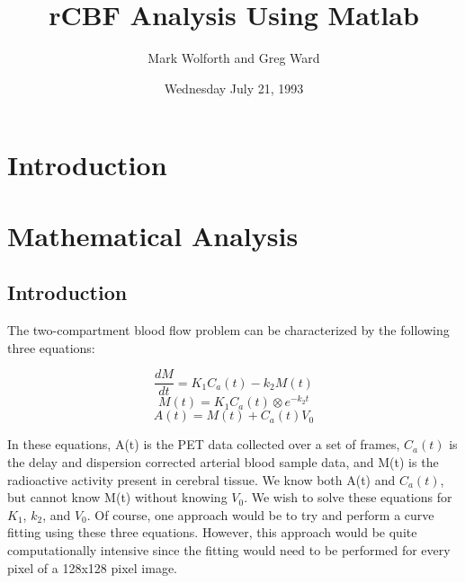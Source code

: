
\title{rCBF Analysis Using Matlab}
\author{Mark Wolforth and Greg Ward}
\date{Wednesday July 21, 1993}



\maketitle
\newpage

\tableofcontents

\newpage
\section{Introduction}


\section{Mathematical Analysis}

\subsection{Introduction}

The two-compartment blood flow problem can be characterized by the
following three equations:

\begin{equation}
\frac{dM}{dt} = K_{1}C_{a}(t) - k_{2}M(t)      \label{eq:2comp1}
\end{equation}
\begin{equation}
M(t) = K_{1}C_{a}(t) \otimes e^{-k_{2}t}       \label{eq:2comp2}
\end{equation}
\begin{equation}
A(t) = M(t) + C_{a}(t)V_{0}                    \label{eq:2comp3}
\end{equation}

In these equations, A(t) is the PET data collected over a set of
frames, $C_{a}(t)$ is the delay and dispersion corrected arterial
blood sample data, and M(t) is the radioactive activity present in
cerebral tissue.  We know both A(t) and $C_{a}(t)$, but cannot know
M(t) without knowing $V_{0}$.  We wish to solve these equations for
$K_{1}$, $k_{2}$, and $V_{0}$.  Of course, one approach would be to
try and perform a curve fitting using these three equations.  However,
this approach would be quite computationally intensive since the
fitting would need to be performed for every pixel of a 128x128 pixel
image.

